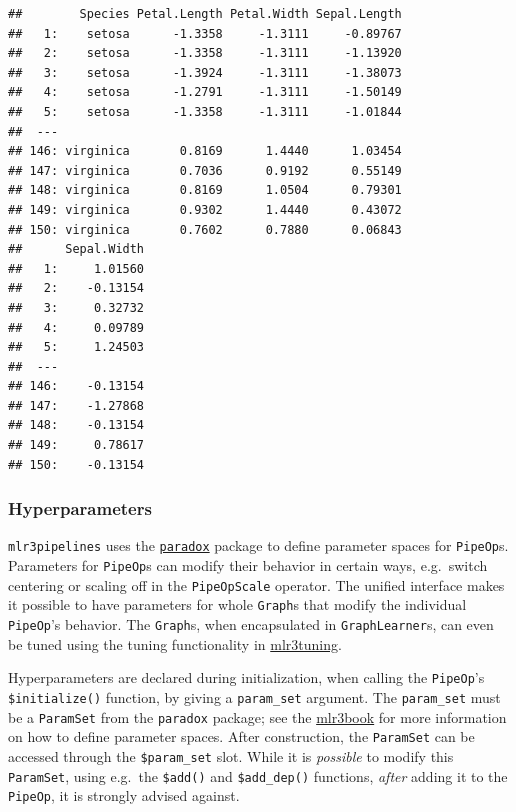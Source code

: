 \documentclass[]{article}
\begin{document}
\begin{verbatim}
##        Species Petal.Length Petal.Width Sepal.Length
##   1:    setosa      -1.3358     -1.3111     -0.89767
##   2:    setosa      -1.3358     -1.3111     -1.13920
##   3:    setosa      -1.3924     -1.3111     -1.38073
##   4:    setosa      -1.2791     -1.3111     -1.50149
##   5:    setosa      -1.3358     -1.3111     -1.01844
##  ---                                                
## 146: virginica       0.8169      1.4440      1.03454
## 147: virginica       0.7036      0.9192      0.55149
## 148: virginica       0.8169      1.0504      0.79301
## 149: virginica       0.9302      1.4440      0.43072
## 150: virginica       0.7602      0.7880      0.06843
##      Sepal.Width
##   1:     1.01560
##   2:    -0.13154
##   3:     0.32732
##   4:     0.09789
##   5:     1.24503
##  ---            
## 146:    -0.13154
## 147:    -1.27868
## 148:    -0.13154
## 149:     0.78617
## 150:    -0.13154
\end{verbatim}

\hypertarget{ext-pipe-hyperpars}{%
\subsubsection{Hyperparameters}\label{ext-pipe-hyperpars}}

\texttt{mlr3pipelines} uses the \href{https://paradox.mlr-org.com}{\texttt{paradox}} package to define parameter spaces for \texttt{PipeOp}s.
Parameters for \texttt{PipeOp}s can modify their behavior in certain ways, e.g.~switch centering or scaling off in the \texttt{PipeOpScale} operator.
The unified interface makes it possible to have parameters for whole \texttt{Graph}s that modify the individual \texttt{PipeOp}'s behavior.
The \texttt{Graph}s, when encapsulated in \texttt{GraphLearner}s, can even be tuned using the tuning functionality in \href{https://mlr3tuning.mlr-org.com}{mlr3tuning}.

Hyperparameters are declared during initialization, when calling the \texttt{PipeOp}'s \texttt{\$initialize()} function, by giving a \texttt{param\_set} argument.
The \texttt{param\_set} must be a \texttt{ParamSet} from the \texttt{paradox} package; see the \href{https://mlr3book.mlr-org.com}{mlr3book} for more information on how to define parameter spaces.
After construction, the \texttt{ParamSet} can be accessed through the \texttt{\$param\_set} slot.
While it is \emph{possible} to modify this \texttt{ParamSet}, using e.g.~the \texttt{\$add()} and \texttt{\$add\_dep()} functions, \emph{after} adding it to the \texttt{PipeOp}, it is strongly advised against.
\end{document}
